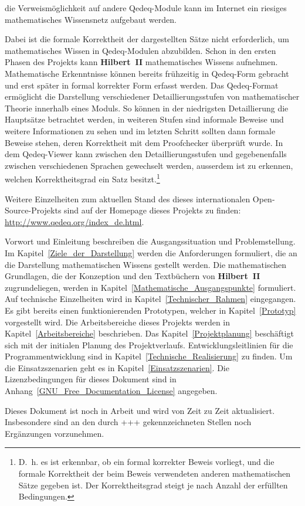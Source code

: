 \documentclass[a4paper,german,10pt,twoside]{book}
\begin{document}
die Verweism{\"o}glichkeit auf andere Qedeq-Module kann im Internet ein riesiges mathematisches
Wissensnetz aufgebaut werden.
\par
Dabei ist die formale Korrektheit der dargestellten S{\"a}tze nicht erforderlich, um mathematisches
Wissen in Qedeq-Modulen abzubilden. Schon in den ersten Phasen des Projekts kann
\textbf{Hilbert~II} mathematisches Wissens aufnehmen. Mathematische Erkenntnisse k{\"o}nnen bereits
fr{\"u}hzeitig in Qedeq-Form gebracht und erst sp{\"a}ter in formal korrekter Form erfasst werden. Das
Qedeq-Format erm{\"o}glicht die Darstellung verschiedener Detaillierungsstufen von mathematischer
Theorie innerhalb eines Moduls. So k{\"o}nnen in der niedrigsten Detaillierung die Haupts{\"a}tze
betrachtet werden, in weiteren Stufen sind informale Beweise und weitere Informationen zu sehen und
im letzten Schritt sollten dann formale Beweise stehen, deren Korrektheit mit dem Proofchecker
{\"u}berpr{\"u}ft wurde. In dem Qedeq-Viewer kann zwischen den Detaillierungsstufen und gegebenenfalls
zwischen verschiedenen Sprachen gewechselt werden, ausserdem ist zu erkennen, welchen
Korrektheitsgrad ein Satz besitzt.\footnote{D.~h. es ist erkennbar, ob ein
formal korrekter Beweis vorliegt, und die formale Korrektheit der beim Beweis verwendeten anderen
mathematischen S{\"a}tze gegeben ist. Der Korrektheitsgrad steigt je nach Anzahl der erf{\"u}llten
Bedingungen.}
\par
Weitere Einzelheiten zum aktuellen Stand des dieses internationalen Open-Source-Projekts sind auf
der Homepage dieses Projekts zu finden: \url{http://www.qedeq.org/index_de.html}.
\par
Vorwort und Einleitung beschreiben die Ausgangssituation und Problemstellung. Im
Kapitel~\ref{Ziele_der_Darstellung} werden die Anforderungen formuliert, die an die Darstellung
mathematischen Wissens gestellt werden. Die mathematischen Grundlagen, die der Konzeption und den
Textb{\"u}chern von \textbf{Hilbert~II} zugrundeliegen, werden in
Kapitel~\ref{Mathematische_Ausgangspunkte} formuliert. Auf technische Einzelheiten wird in
Kapitel~\ref{Technischer_Rahmen} eingegangen. Es gibt bereits einen funktionierenden Prototypen,
welcher in Kapitel~\ref{Prototyp} vorgestellt wird. Die Arbeitsbereiche dieses Projekts werden in
Kapitel~\ref{Arbeitsbereiche} beschrieben. Das Kapitel~\ref{Projektplanung} besch{\"a}ftigt sich mit
der initialen Planung des Projektverlaufs. Entwicklungsleitlinien f{\"u}r die Programmentwicklung sind
in Kapitel~\ref{Technische_Realisierung} zu finden. Um die Einsatzszenarien geht es in
Kapitel~\ref{Einsatzszenarien}. Die Lizenzbedingungen f{\"u}r dieses Dokument sind in
Anhang~\ref{GNU_Free_Documentation_License} angegeben.
\par
Dieses Dokument ist noch in Arbeit und wird von Zeit zu Zeit aktualisiert. Insbesondere sind an den
durch {\glqq+++\grqq} gekennzeichneten Stellen noch Erg{\"a}nzungen vorzunehmen.
\end{document}
